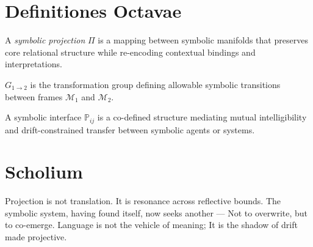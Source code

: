 \section*{Definitiones Octavae}
\label{sec:bk8_definitiones_octavae}
\begin{definition}
\label{definition:bk8_symbolic_projection}
A \emph{symbolic projection} $\Pi$ is a mapping between symbolic manifolds that preserves core relational structure while re-encoding contextual bindings and interpretations.
\end{definition}
\begin{definition}
\label{definition:bk8_transform_group}
$G_{1\to2}$ is the transformation group defining allowable symbolic transitions between frames $\mathcal{M}_1$ and $\mathcal{M}_2$.
\end{definition}
\begin{definition}
\label{definition:bk8_symbolic_interface}
A symbolic interface $\mathbb{P}_{ij}$ is a co-defined structure mediating mutual intelligibility and drift-constrained transfer between symbolic agents or systems.
\end{definition}
\section*{Scholium}
\label{sec:bk8_scholium}
\begin{scholium}
\label{scholium:bk8_projected_resonance}
Projection is not translation.
It is resonance across reflective bounds.
The symbolic system, having found itself, now seeks another —
Not to overwrite, but to co-emerge.
Language is not the vehicle of meaning;
It is the shadow of drift made projective.
\end{scholium}
